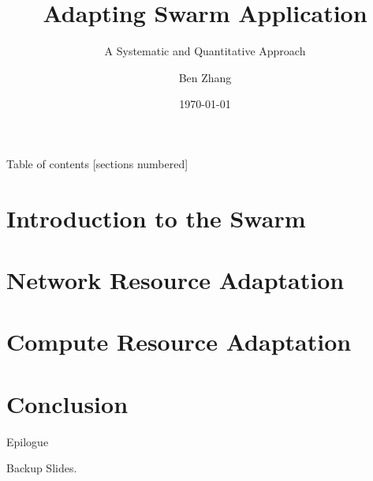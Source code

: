 \documentclass[xcolor=table, handout, 10pt]{beamer}
\title{Adapting Swarm Application}
\subtitle{A Systematic and Quantitative Approach}
\date{\today}
\author{Ben Zhang}
\institute{TerraSwarm Research Center}
\begin{document}
\maketitle

\ifdefined\iscomplete

\begin{frame}{Table of contents}
  [sections numbered]
  \tableofcontents[hideallsubsections]
\end{frame}

\section{Introduction to the Swarm}


\section{Network Resource Adaptation}







\section{Compute Resource Adaptation}




\section{Conclusion}


\appendix

\begin{frame}[standout]
  Epilogue
\end{frame}



\begin{frame}[standout]
  Backup Slides.
\end{frame}



\else

% 







\end{document}
